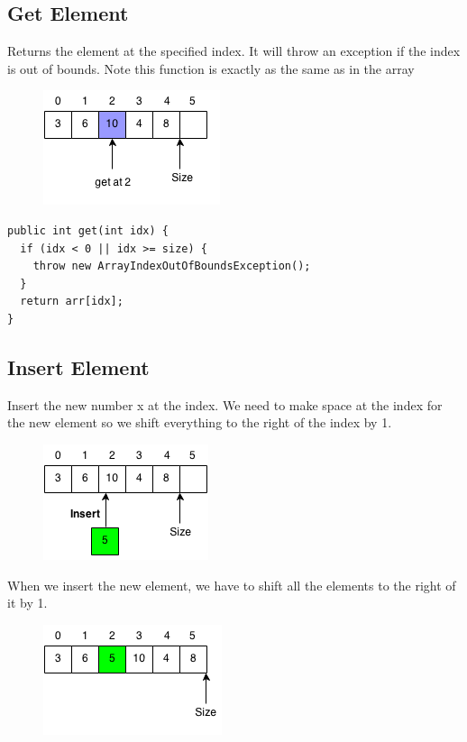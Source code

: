 \documentclass[11pt,oneside]{book}
\makeatletter
\def\maxwidth#1{\ifdim\Gin@nat@width>#1 #1\else\Gin@nat@width\fi}
\makeatother
\begin{document}
\subsection{Get Element}

Returns the element at the specified index. It will throw an exception if the index is out of bounds. Note this function is exactly as the same as in the array

\vspace{5px}\begin{figure}[H]\centering
        \includegraphics[width=0.66\maxwidth{\textwidth}]{vectorget.png}
        \end{figure}

\begin{lstlisting}
public int get(int idx) {
  if (idx < 0 || idx >= size) {
    throw new ArrayIndexOutOfBoundsException();
  }
  return arr[idx];
}
\end{lstlisting}

\subsection{Insert Element}

Insert the new number x at the index. We need to make space at the index for the new element so we shift everything to the right of the index by 1.

\vspace{5px}\begin{figure}[H]\centering
        \includegraphics[width=0.66\maxwidth{\textwidth}]{vectorinsert.png}
        \end{figure}

When we insert the new element, we have to shift all the elements to the right of it by 1.

\vspace{5px}\begin{figure}[H]\centering
        \includegraphics[width=0.66\maxwidth{\textwidth}]{vectorinsert2.png}
        \end{figure}
\end{document}
